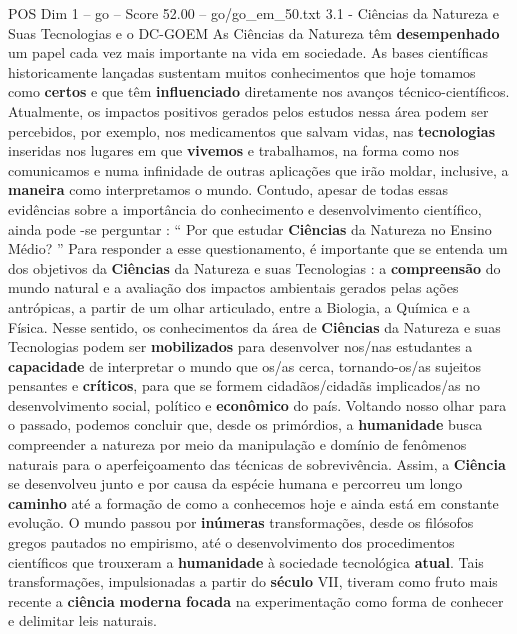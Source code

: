 \begin{textsample}{POS Dim 1 – go – Score 52.00 – go/go\_em\_50.txt}  \label{ex:f1_pos_097}
3.1 - Ciências da Natureza e Suas Tecnologias e o DC-GOEM As Ciências da Natureza têm \textbf{desempenhado} um papel cada vez mais importante na vida em sociedade.
As bases científicas historicamente lançadas sustentam muitos conhecimentos que hoje tomamos como \textbf{certos} e que têm \textbf{influenciado} diretamente nos avanços técnico-científicos.
Atualmente, os impactos positivos gerados pelos estudos nessa área podem ser percebidos, por exemplo, nos medicamentos que salvam vidas, nas \textbf{tecnologias} inseridas nos lugares em que \textbf{vivemos} e trabalhamos, na forma como nos comunicamos e numa infinidade de outras aplicações que irão moldar, inclusive, a \textbf{maneira} como interpretamos o mundo.
Contudo, apesar de todas essas evidências sobre a importância do conhecimento e desenvolvimento científico, ainda pode -se perguntar : “ Por que estudar \textbf{Ciências} da Natureza no Ensino Médio? ” Para responder a esse questionamento, é importante que se entenda um dos objetivos da \textbf{Ciências} da Natureza e suas Tecnologias : a \textbf{compreensão} do mundo natural e a avaliação dos impactos ambientais gerados pelas ações antrópicas, a partir de um olhar articulado, entre a Biologia, a Química e a Física.
Nesse sentido, os conhecimentos da área de \textbf{Ciências} da Natureza e suas Tecnologias podem ser \textbf{mobilizados} para desenvolver nos/nas estudantes a \textbf{capacidade} de interpretar o mundo que os/as cerca, tornando-os/as sujeitos pensantes e \textbf{críticos}, para que se formem cidadãos/cidadãs implicados/as no desenvolvimento social, político e \textbf{econômico} do país.
Voltando nosso olhar para o passado, podemos concluir que, desde os primórdios, a \textbf{humanidade} busca compreender a natureza por meio da manipulação e domínio de fenômenos naturais para o aperfeiçoamento das técnicas de sobrevivência.
Assim, a \textbf{Ciência} se desenvolveu junto e por causa da espécie humana e percorreu um longo \textbf{caminho} até a formação de como a conhecemos hoje e ainda está em constante evolução.
O mundo passou por \textbf{inúmeras} transformações, desde os filósofos gregos pautados no empirismo, até o desenvolvimento dos procedimentos científicos que trouxeram a \textbf{humanidade} à sociedade tecnológica \textbf{atual}.
Tais transformações, impulsionadas a partir do \textbf{século} VII, tiveram como fruto mais recente a \textbf{ciência} \textbf{moderna} \textbf{focada} na experimentação como forma de conhecer e delimitar leis naturais.

\end{textsample}
